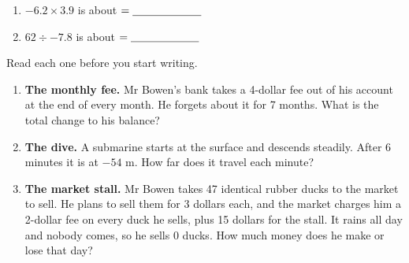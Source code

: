 \documentclass[12pt,a4paper]{article}
\begin{document}
\vspace{6pt}
\begin{enumerate}[label=(\roman*), itemsep=6pt, start=4]
  \item $-6.2 \times 3.9$ \quad is about \blank[3.4cm] $= \blank[2.2cm]$
  \item $62 \div -7.8$ \quad is about \blank[3.4cm] $= \blank[2.2cm]$
\end{enumerate}


\noindent Read each one  before you start writing.

\begin{enumerate}[label=\textbf{\arabic*.}, itemsep=14pt]

  \item \textbf{The monthly fee.} Mr Bowen's bank takes a 4-dollar fee out of his
        account at the end of every month. He forgets about it for 7 months. What is
        the total change to his balance?
        \begin{workspace}[2.8cm]\end{workspace}

  \item \textbf{The dive.} A submarine starts at the surface and descends steadily.
        After 6 minutes it is at $-54$ m. How far does it travel each minute?
        \begin{workspace}[2.8cm]\end{workspace}

  \item \textbf{The market stall.} Mr Bowen takes 47 identical rubber ducks to the
        market to sell. He plans to sell them for 3 dollars each, and the market
        charges him a 2-dollar fee on every duck he sells, plus 15 dollars for the
        stall. It rains all day and nobody comes, so he sells 0 ducks. How much money
        does he make or lose that day?
        \begin{workspace}[3.1cm]\end{workspace}

\end{enumerate}

\end{document}
